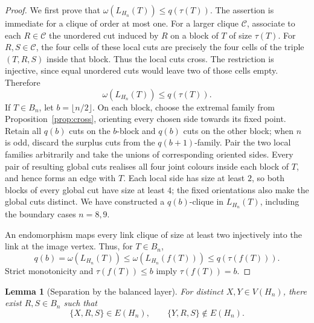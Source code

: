 \documentclass[11pt]{article}
\newtheorem{lemma}[theorem]{Lemma}
\begin{document}
\begin{proof}
We first prove that \(\omega(L_{H_n}(T))\le q(\tau(T))\).  The assertion is
immediate for a clique of order at most one.  For a larger clique
\(\mathcal C\), associate to each \(R\in\mathcal C\) the unordered cut
induced by \(R\) on a block of \(T\) of size \(\tau(T)\).  For
\(R,S\in\mathcal C\), the four
cells of these local cuts are precisely the four cells of the triple
\((T,R,S)\) inside that block.  Thus the local cuts cross.  The restriction
is injective, since equal unordered cuts would leave two of those cells
empty.  Therefore
\[
\omega(L_{H_n}(T))\le q(\tau(T)).
\]
If \(T\in B_n\), let \(b=\lfloor n/2\rfloor\).  On each block, choose the
extremal family from Proposition~\ref{prop:cross}, orienting every chosen
side towards its fixed point.  Retain all \(q(b)\) cuts on the
\(b\)-block and \(q(b)\) cuts on the other block; when \(n\) is odd, discard
the surplus cuts from the \(q(b+1)\)-family.  Pair the two local families
arbitrarily and take the unions of corresponding oriented sides.  Every pair
of resulting global cuts realises all four joint colours inside each block of
\(T\), and hence forms an edge with \(T\).  Each local side has size at least
\(2\), so both blocks of every global cut have size at least \(4\); the fixed
orientations also make the global cuts distinct.  We have constructed a
\(q(b)\)-clique in \(L_{H_n}(T)\), including the boundary cases \(n=8,9\).

An endomorphism maps every link clique of size at least two injectively into
the link at the image vertex.  Thus, for \(T\in B_n\),
\[
q(b)=\omega(L_{H_n}(T))
\le\omega(L_{H_n}(f(T)))
\le q(\tau(f(T))).
\]
Strict monotonicity and \(\tau(f(T))\le b\) imply \(\tau(f(T))=b\).
\end{proof}

\begin{lemma}[Separation by the balanced layer]\label{lem:separation}
For distinct \(X,Y\in V(H_n)\), there exist \(R,S\in B_n\) such that
\[
\{X,R,S\}\in E(H_n),
\qquad
\{Y,R,S\}\notin E(H_n).
\]
\end{lemma}
\end{document}
